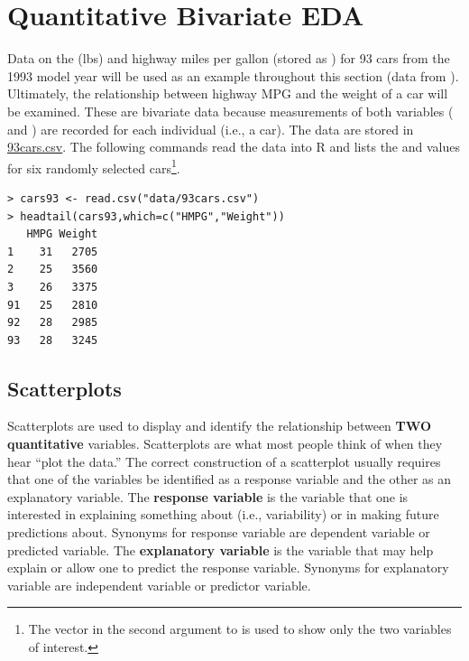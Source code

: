 \documentclass[10pt,openany]{book}\usepackage[]{graphicx}\usepackage[]{color}
\makeatletter
\newenvironment{kframe}{%
 \def\at@end@of@kframe{}%
 \ifinner\ifhmode%
  \def\at@end@of@kframe{\end{minipage}}%
  \begin{minipage}{\columnwidth}%
 \fi\fi%
 \def\FrameCommand##1{\hskip\@totalleftmargin \hskip-\fboxsep
 \colorbox{shadecolor}{##1}\hskip-\fboxsep
     \hskip-\linewidth \hskip-\@totalleftmargin \hskip\columnwidth}%
 \MakeFramed {\advance\hsize-\width
   \@totalleftmargin\z@ \linewidth\hsize
   \@setminipage}}%
 {\par\unskip\endMakeFramed%
 \at@end@of@kframe}
\newenvironment{knitrout}{}{} %
\makeatother
\begin{document}
\section{Quantitative Bivariate EDA} \label{sect:QbivEDA}
Data on the  (lbs) and highway miles per gallon (stored as ) for 93 cars from the 1993 model year will be used as an example throughout this section (data from \cite{Lock1993}).  Ultimately, the relationship between highway MPG and the weight of a car will be examined.  These are bivariate data because measurements of both variables ( and ) are recorded for each individual (i.e., a car).  The data are stored in \href{https://raw.githubusercontent.com/droglenc/NCData/master/93cars.csv}{93cars.csv}.  The following commands read the data into R and lists the  and  values for six randomly selected cars\footnote{The vector in the second argument to  is used to show only the two variables of interest.}.
\begin{knitrout}
\color{fgcolor}\begin{kframe}
\begin{verbatim}
> cars93 <- read.csv("data/93cars.csv")
> headtail(cars93,which=c("HMPG","Weight"))
   HMPG Weight
1    31   2705
2    25   3560
3    26   3375
91   25   2810
92   28   2985
93   28   3245
\end{verbatim}
\end{kframe}
\end{knitrout}

\subsection{Scatterplots} 
Scatterplots are used to display and identify the relationship between \textbf{TWO quantitative} variables.  Scatterplots are what most people think of when they hear ``plot the data.''  The correct construction of a scatterplot usually requires that one of the variables be identified as a response variable and the other as an explanatory variable.  The \textbf{response variable} is the variable that one is interested in explaining something about (i.e., variability) or in making future predictions about.  Synonyms for response variable are dependent variable or predicted variable.  The \textbf{explanatory variable} is the variable that may help explain or allow one to predict the response variable.  Synonyms for explanatory variable are independent variable or predictor variable.
\end{document}
